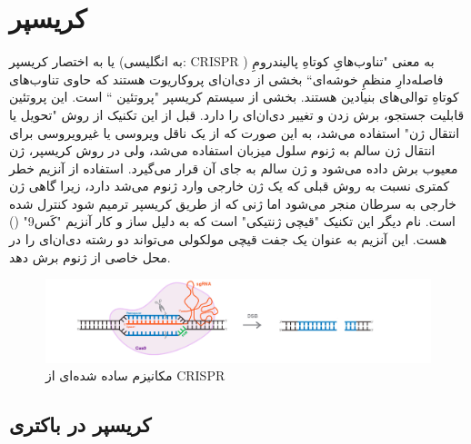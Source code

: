 \documentclass[12pt,a4paper,BCOR=.7cm,headsepline,bibliography=totoc]{report}
\begin{document}
\section{کریسپر}
 یا به اختصار کریسپر (به انگلیسی: CRISPR ) به معنی "تناوب‌هایِ کوتاهِ پالیندرومِ فاصله‌دارِ منظمِ خوشه‌ای`` بخشی از دی‌ان‌ای پروکاریوت هستند که حاوی تناوب‌های کوتاهِ توالی‌های بنیادین هستند. بخشی از سیستم کریسپر "پروتئین  `` است. این پروتئین قابلیت جستجو، برش زدن و تغییر دی‌ان‌ای را دارد. قبل از این تکنیک از روش "تحویل یا انتقال ژن" استفاده می‌شد، به این صورت که از یک ناقل ویروسی یا غیرویروسی برای انتقال ژن سالم به ژنوم سلول میزبان استفاده می‌شد، ولی در روش کریسپر، ژن معیوب برش داده می‌شود و ژن سالم به جای آن قرار می‌گیرد. استفاده از آنزیم  خطر کمتری نسبت به روش قبلی که یک ژن خارجی وارد ژنوم می‌شد دارد، زیرا گاهی ژن خارجی به سرطان منجر می‌شود اما ژنی که از طریق کریسپر ترمیم شود کنترل شده است. نام دیگر این تکنیک "قیچی ژنتیکی" است که به دلیل ساز و کار آنزیم "کَس9" () هست. این آنزیم به عنوان یک جفت قیچی مولکولی می‌تواند دو رشته دی‌ان‌ای را در محل خاصی از ژنوم برش دهد.\cite{TED}
\begin{figure}[!h]
\centering
\includegraphics[width=15cm, ]{pictures/simple_crispr.jpg}
\caption{
مکانیزم ساده شده‌ای از CRISPR \cite{graph4}
}\label{fig:1}
\end{figure}

\subsection{کریسپر در باکتری}
\end{document}
